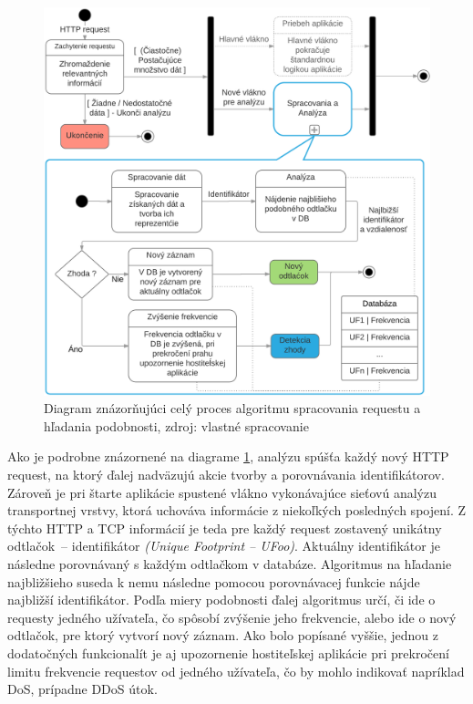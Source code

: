 \documentclass[
  digital, %
  table,   %
  lof,     %
  nolot,   %
  nocover
]{fithesis3}
\begin{document}
\begin{figure}[h]
  \centering
    \includegraphics[width=.93\textwidth]{images/footprint-hl.png}
  \caption{Diagram znázorňujúci celý proces algoritmu spracovania requestu a
  hľadania podobnosti, zdroj: vlastné spracovanie}
  \label{fig:footprint-hl}
\end{figure}

Ako je podrobne znázornené na diagrame \ref{fig:footprint-hl}, analýzu spúšťa každý nový
HTTP request, na ktorý ďalej nadväzujú akcie tvorby a porovnávania
identifikátorov. Zároveň je pri štarte aplikácie spustené vlákno vykonávajúce
sieťovú analýzu transportnej vrstvy, ktorá uchováva informácie z niekoľkých
posledných spojení. Z týchto HTTP a TCP informácií je teda pre každý request
zostavený unikátny odtlačok~-- identifikátor \textit{(Unique Footprint -- UFoo)}.
Aktuálny identifikátor je následne porovnávaný s každým odtlačkom v databáze.
Algoritmus na hľadanie najbližšieho suseda k nemu následne pomocou porovnávacej
funkcie nájde najbližší identifikátor. Podľa miery podobnosti ďalej
algoritmus určí, či ide o requesty jedného užívateľa, čo spôsobí zvýšenie jeho
frekvencie, alebo ide o nový odtlačok, pre ktorý vytvorí nový záznam.
Ako bolo popísané vyššie, jednou z dodatočných funkcionalít je aj upozornenie hostiteľskej aplikácie pri
prekročení limitu frekvencie requestov od jedného užívateľa, čo by mohlo
indikovať napríklad DoS, prípadne DDoS útok.
\end{document}

